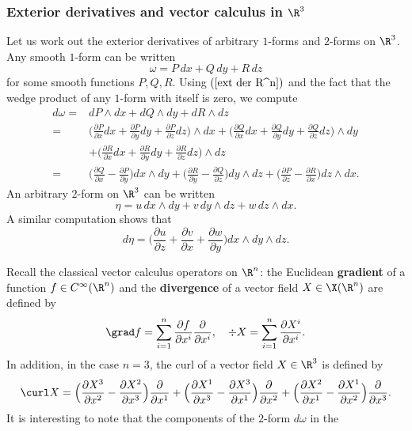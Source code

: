 \subsubsection{Exterior derivatives and vector calculus in \boldmath$\R^3$}
\begin{example}
Let us work out the exterior derivatives of arbitrary $1$-forms and $2$-forms on $\R^3$. Any smooth $1$-form can be written
\[\omega=P\,dx+Q\,dy+R\,dz\]
for some smooth functions $P,Q,R$. Using $(\ref{ext der R^n})$ and the fact that the wedge product of any $1$-form with itself is zero, we compute
\begin{align*}
d\omega=&dP\wedge dx+dQ\wedge dy+dR\wedge dz\\
=&\Big(\frac{\partial P}{\partial x}dx+\frac{\partial P}{\partial y}dy+\frac{\partial P}{\partial z}dz\Big)\wedge dx+\Big(\frac{\partial Q}{\partial x}dx+\frac{\partial Q}{\partial y}dy+\frac{\partial Q}{\partial z}dz\Big)\wedge dy\\
&+\Big(\frac{\partial R}{\partial x}dx+\frac{\partial R}{\partial y}dy+\frac{\partial R}{\partial z}dz\Big)\wedge dz\\
=&\Big(\frac{\partial Q}{\partial x}-\frac{\partial P}{\partial y}\Big)dx\wedge dy+\Big(\frac{\partial R}{\partial y}-\frac{\partial Q}{\partial z}\Big)dy\wedge dz+\Big(\frac{\partial P}{\partial z}-\frac{\partial R}{\partial x}\Big)dz\wedge dx.
\end{align*}
An arbitrary $2$-form on $\R^3$ can be written
\[\eta=u\,dx\wedge dy+v\,dy\wedge dz+w\,dz\wedge dx.\]
A similar computation shows that
\[d\eta=\Big(\frac{\partial u}{\partial z}+\frac{\partial v}{\partial x}+\frac{\partial w}{\partial y}\Big)dx\wedge dy\wedge dz.\]
\end{example}
Recall the classical vector calculus operators on $\R^n$: the Euclidean \textbf{gradient} of a function $f\in C^\infty(\R^n)$ and the \textbf{divergence} of a vector field $X\in\X(\R^n)$ are defined by
\[\grad f=\sum_{i=1}^{n}\frac{\partial f}{\partial x^i}\frac{\partial}{\partial x^i},\quad \div X=\sum_{i=1}^{n}\frac{\partial X^i}{\partial x^i}.\]
In addition, in the case $n=3$, the curl of a vector field $X\in\R^3$ is defined by
\[\curl X=\Big(\frac{\partial X^3}{\partial x^2}-\frac{\partial X^2}{\partial x^3}\Big)\frac{\partial}{\partial x^1}+\Big(\frac{\partial X^1}{\partial x^3}-\frac{\partial X^3}{\partial x^1}\Big)\frac{\partial}{\partial x^2}+\Big(\frac{\partial X^2}{\partial x^1}-\frac{\partial X^1}{\partial x^2}\Big)\frac{\partial}{\partial x^3}.\] 
It is interesting to note that the components of the $2$-form $d\omega$ in the
